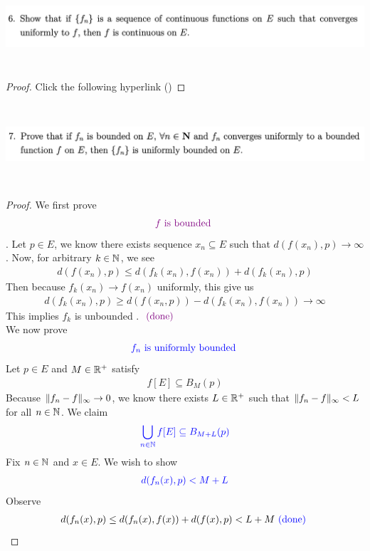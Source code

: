 \documentclass{report}
\begin{document}
\begin{question}{}{}
\includegraphics[height=3cm,width=18cm]{HW1.2}
\end{question}
\begin{proof}
Click the following hyperlink
()
\end{proof}
\begin{question}{}{}

\includegraphics[height=3cm,width=18cm]{HW1.1}
\end{question}
\begin{proof}
We first prove 
\begin{align*}
\textcolor{violet}{f\text{ is bounded }}
\end{align*}
. Let $p \in E$, we know there exists sequence  $x_n \subseteq E$ such that  $d(f(x_n),p) \to \infty$. Now, for arbitrary $k \in\mathbb{N}$, we see
\begin{align*}
d(f(x_n),p)\leq d(f_k(x_n),f(x_n))+d(f_k(x_n),p)
\end{align*}
Then because $f_k(x_n) \to f(x_n)$ uniformly, this give us 
\begin{align*}
d(f_k(x_n),p)\geq d(f(x_n,p))-d(f_k(x_n),f(x_n))\to \infty
\end{align*}
This implies $f_k$ is unbounded \CaC. $\textcolor{violet}{\text{ (done) }}$\\

We now prove 
\begin{align*}
\textcolor{blue}{f_n\text{ is uniformly bounded }}
\end{align*}
Let $p \in E$ and $M \in\mathbb{R}^+$ satisfy 
\begin{align*}
f[E]\subseteq B_M(p)
\end{align*}
Because $\| f_n-f \|_\infty \to 0$, we know there exists $L\in\mathbb{R}^+$ such that $\| f_n-f \|_\infty <L$ for all $n\in\mathbb{N}$. We claim 
\begin{align*}
\textcolor{blue}{\bigcup_{n\in\mathbb{N}}f[E]\subseteq B_{M+L}(p)}
\end{align*}
Fix $n \in\mathbb{N}$ and $x \in E$. We wish to show 
\begin{align*}
\textcolor{blue}{d(f_n(x),p)<M+L}
\end{align*}
Observe 
\begin{align*}
d(f_n(x),p)\leq d(f_n(x),f(x))+d(f(x),p)< L+M \textcolor{blue}{\text{ (done) }}
\end{align*}
\end{proof}
\end{document}
